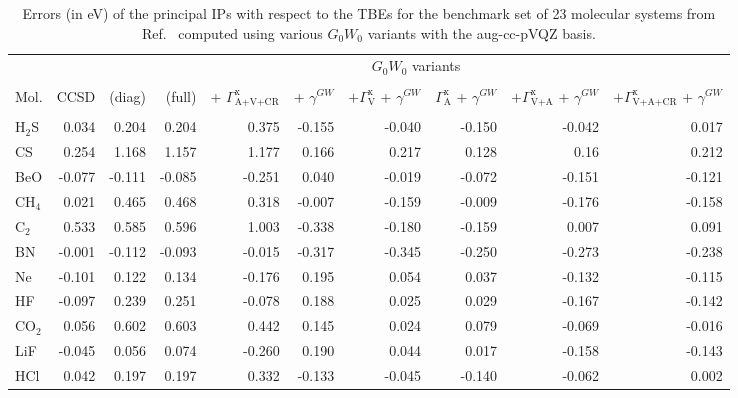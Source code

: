 \documentclass[aip,jcp,reprint,noshowkeys,superscriptaddress]{revtex4-2}
\newcommand{\fnm}{\footnotemark}
\begin{document}
\begin{squeezetable}
\begin{table}
\begin{ruledtabular}
	\caption{Errors (in \si{\eV}) of the principal IPs with respect to the TBEs for the benchmark set of 23 molecular systems from Ref.~ computed using various $G_0W_0$ variants with the aug-cc-pVQZ basis.}
	\label{tab:ips_val}
	\begin{tabular}{l r r r r r r r r r}
		& & \multicolumn{8}{c}{$G_0W_0$ variants} \\
		\cline{3-10} \vspace{-0.2cm}\\ 
		Mol. & CCSD\fnm[1] & 
		(diag)\fnm[2] &
		(full) &
		+ $\Gamma^{\text{x}}_\text{A+V+CR}$ &
		+ $\gamma^{GW}$ &
		$+ \Gamma^{\text{x}}_\text{V}$ + $\gamma^{GW}$ &
		$\Gamma^{\text{x}}_\text{A}$ + $\gamma^{GW}$ &
		$+ \Gamma^{\text{x}}_\text{V+A}$ + $\gamma^{GW}$ &
		$+\Gamma^{\text{x}}_\text{V+A+CR}$ + $\gamma^{GW}$ \vspace{0.1cm}\\
		\cline{1-10}\vspace{-0.2cm}\\
H$_2$S & 0.034 & 0.204 & 0.204 & 0.375 & -0.155 & -0.040 & -0.150 & -0.042 & 0.017 \\
CS & 0.254 & 1.168 & 1.157 & 1.177 & 0.166 & 0.217 & 0.128 & 0.16 & 0.212 \\
BeO & -0.077 & -0.111 & -0.085 & -0.251 & 0.040 & -0.019 & -0.072 & -0.151 & -0.121 \\
CH$_4$ & 0.021 & 0.465 & 0.468 & 0.318 & -0.007 & -0.159 & -0.009 & -0.176 & -0.158 \\
C$_2$ & 0.533 & 0.585 & 0.596 & 1.003 & -0.338 & -0.180 & -0.159 & 0.007 & 0.091 \\
BN & -0.001 & -0.112 & -0.093 & -0.015 & -0.317 & -0.345 & -0.250 & -0.273 & -0.238 \\
Ne & -0.101 & 0.122 & 0.134 & -0.176 & 0.195 & 0.054 & 0.037 & -0.132 & -0.115 \\
HF & -0.097 & 0.239 & 0.251 & -0.078 & 0.188 & 0.025 & 0.029 & -0.167 & -0.142 \\
CO$_2$ & 0.056 & 0.602 & 0.603 & 0.442 & 0.145 & 0.024 & 0.079 & -0.069 & -0.016 \\
LiF & -0.045 & 0.056 & 0.074 & -0.260 & 0.190 & 0.044 & 0.017 & -0.158 & -0.143 \\
HCl & 0.042 & 0.197 & 0.197 & 0.332 & -0.133 & -0.045 & -0.140 & -0.062 & 0.002 \\

\end{tabular}
\end{ruledtabular}
\end{table}
\end{squeezetable}
\end{document}
